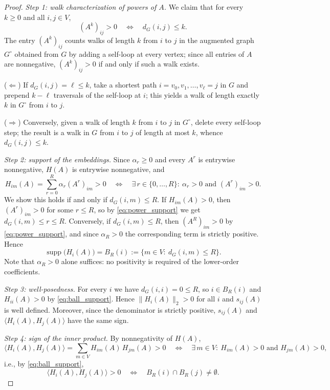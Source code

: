 \documentclass{article}
\begin{document}
\begin{proof}
\emph{Step 1: walk characterization of powers of $A$.}
We claim that for every $k\geq 0$ and all $i,j\in V$,
\begin{equation}\label{eq:power_support}
(A^k)_{ij}>0 \quad\Longleftrightarrow\quad d_G(i,j)\leq k .
\end{equation}
The entry $(A^k)_{ij}$ counts walks of length $k$ from $i$ to $j$ in the
augmented graph $G^{\circ}$ obtained from $G$ by adding a self-loop at
every vertex; since all entries of $A$ are nonnegative, $(A^k)_{ij}>0$
if and only if such a walk exists.

($\Leftarrow$) If $d_G(i,j)=\ell\leq k$, take a shortest path
$i=v_0,v_1,\dots,v_\ell=j$ in $G$ and prepend $k-\ell$ traversals of the
self-loop at $i$; this yields a walk of length exactly $k$ in
$G^{\circ}$ from $i$ to $j$.

($\Rightarrow$) Conversely, given a walk of length $k$ from $i$ to $j$
in $G^{\circ}$, delete every self-loop step; the result is a walk in $G$
from $i$ to $j$ of length at most $k$, whence $d_G(i,j)\leq k$.

\emph{Step 2: support of the embeddings.}
Since $\alpha_r\geq 0$ and every $A^r$ is entrywise nonnegative, $H(A)$
is entrywise nonnegative, and
\[
H_{im}(A)=\sum_{r=0}^{R}\alpha_r (A^r)_{im}>0
\quad\Longleftrightarrow\quad
\exists\, r\in\{0,\dots,R\}:\ \alpha_r>0 \text{ and } (A^r)_{im}>0 .
\]
We show this holds if and only if $d_G(i,m)\leq R$. If $H_{im}(A)>0$,
then $(A^r)_{im}>0$ for some $r\leq R$, so by \eqref{eq:power_support}
we get $d_G(i,m)\leq r\leq R$. Conversely, if $d_G(i,m)\leq R$, then
$(A^R)_{im}>0$ by \eqref{eq:power_support}, and since $\alpha_R>0$ the
corresponding term is strictly positive. Hence
\begin{equation}\label{eq:ball_support}
\operatorname{supp}\bigl(H_i(A)\bigr)
= B_R(i) := \{m\in V:\ d_G(i,m)\leq R\}.
\end{equation}
Note that $\alpha_R>0$ alone suffices: no positivity is required of the
lower-order coefficients.

\emph{Step 3: well-posedness.}
For every $i$ we have $d_G(i,i)=0\leq R$, so $i\in B_R(i)$ and
$H_{ii}(A)>0$ by \eqref{eq:ball_support}. Hence $\|H_i(A)\|_2>0$ for all
$i$ and $s_{ij}(A)$ is well defined. Moreover, since the denominator is
strictly positive, $s_{ij}(A)$ and $\langle H_i(A),H_j(A)\rangle$ have
the same sign.

\emph{Step 4: sign of the inner product.}
By nonnegativity of $H(A)$,
\[
\langle H_i(A),H_j(A)\rangle
= \sum_{m\in V} H_{im}(A)\,H_{jm}(A) > 0
\quad\Longleftrightarrow\quad
\exists\, m\in V:\ H_{im}(A)>0 \text{ and } H_{jm}(A)>0,
\]
i.e., by \eqref{eq:ball_support},
\begin{equation}\label{eq:ball_intersect}
\langle H_i(A),H_j(A)\rangle>0
\quad\Longleftrightarrow\quad
B_R(i)\cap B_R(j)\neq\emptyset .
\end{equation}


\end{proof}
\end{document}
